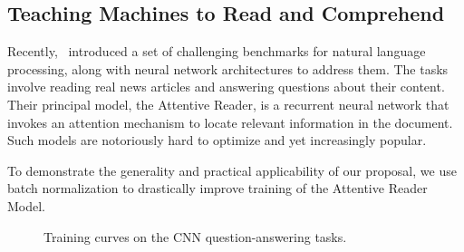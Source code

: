 \documentclass{article} %
\begin{document}
\subsection{Teaching Machines to Read and Comprehend}
\label{sec:less-attr}

Recently,~\citep{attentivereader} introduced a set of challenging benchmarks for natural language processing, along with neural network architectures to address them.
The tasks involve reading real news articles and answering questions about their content.
Their principal model, the Attentive Reader, is a recurrent neural network that invokes an attention mechanism to locate relevant information in the document.
Such models are notoriously hard to optimize and yet increasingly popular.

To demonstrate the generality and practical applicability of our proposal,
we use batch normalization to drastically improve training of the Attentive Reader Model.

\begin{figure}[!ht]
  \center%
  \hspace{2mm}%
  \caption{Training curves on the CNN question-answering tasks.}
  \label{fig:attr2}
\end{figure}
\end{document}
